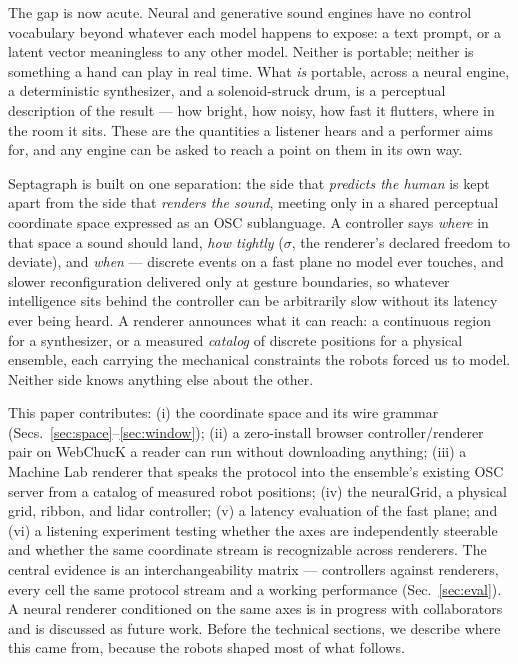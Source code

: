 The gap is now acute. Neural and generative sound engines have no
control vocabulary beyond whatever each model happens to expose: a
text prompt, or a latent vector meaningless to any other model.
Neither is portable; neither is something a hand can play in real
time. What \emph{is} portable, across a neural engine, a deterministic
synthesizer, and a solenoid-struck drum, is a perceptual description
of the result --- how bright, how noisy, how fast it flutters, where
in the room it sits. These are the quantities a listener hears and a
performer aims for, and any engine can be asked to reach a point on
them in its own way.

Septagraph is built on one separation: the side that \emph{predicts
the human} is kept apart from the side that \emph{renders the sound},
meeting only in a shared perceptual coordinate space expressed as an
OSC sublanguage. A controller says \emph{where} in that space a sound
should land, \emph{how tightly} ($\sigma$, the renderer's declared
freedom to deviate), and \emph{when} --- discrete events on a fast
plane no model ever touches, and slower reconfiguration delivered only
at gesture boundaries, so whatever intelligence sits behind the
controller can be arbitrarily slow without its latency ever being
heard. A renderer announces what it can reach: a continuous region for
a synthesizer, or a measured \emph{catalog} of discrete positions for a
physical ensemble, each carrying the mechanical constraints the robots
forced us to model. Neither side knows anything else about the other.

This paper contributes: (i) the coordinate space and its wire grammar
(Secs.~\ref{sec:space}--\ref{sec:window}); (ii) a zero-install browser
controller/renderer pair on WebChucK a reader can run without
downloading anything; (iii) a Machine Lab renderer that speaks the
protocol into the ensemble's existing OSC server from a catalog of
measured robot positions; (iv) the neuralGrid, a physical grid, ribbon,
and lidar controller; (v) a latency evaluation of the fast plane; and
(vi) a listening experiment testing whether the axes are independently
steerable and whether the same coordinate stream is recognizable across
renderers. The central evidence is an interchangeability matrix ---
controllers against renderers, every cell the same protocol stream and
a working performance (Sec.~\ref{sec:eval}). A neural renderer
conditioned on the same axes is in progress with collaborators and is
discussed as future work. Before the technical sections, we describe
where this came from, because the robots shaped most of what follows.
